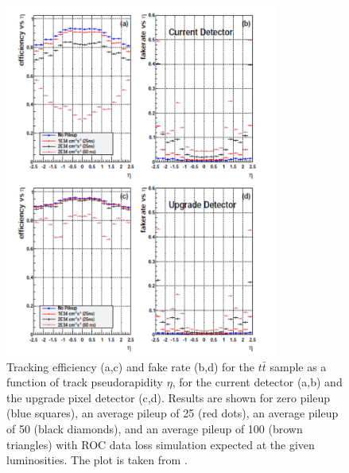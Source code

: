 \begin{figure}[t]
 \centering
 \includegraphics[width=0.8\textwidth]{021_pixel_upgrade/plots/sim_perform.pdf}
 \caption{Tracking efficiency (a,c) and fake rate (b,d) for the $t\bar{t}$ sample as a function of track
          pseudorapidity $\eta$, for the current detector (a,b) and the upgrade pixel detector (c,d). Results are shown for
          zero pileup (blue squares), an average pileup of 25 (red dots), an average pileup of 50 (black
          diamonds), and an average pileup of 100 (brown triangles) with ROC data loss simulation
          expected at the given luminosities. The plot is taken from \cite{CMS:2012sda}.}
 \label{fig:sim_perform}
\end{figure}

